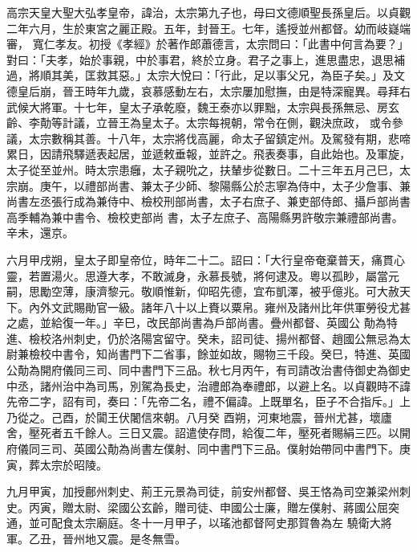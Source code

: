 
\begin{pinyinscope}

 高宗天皇大聖大弘孝皇帝，諱治，太宗第九子也，母曰文德順聖長孫皇后。以貞觀二年六月，生於東宮之麗正殿。五年，封晉王。七年，遙授並州都督。幼而岐嶷端審，
 寬仁孝友。初授《孝經》於著作郎蕭德言，太宗問曰：「此書中何言為要？」對曰：「夫孝，始於事親，中於事君，終於立身。君子之事上，進思盡忠，退思補過，將順其美，匡救其惡。」太宗大悅曰：「行此，足以事父兄，為臣子矣。」及文德皇后崩，晉王時年九歲，哀慕感動左右，太宗屢加慰撫，由是特深寵異。尋拜右武候大將軍。十七年，皇太子承乾廢，魏王泰亦以罪黜，太宗與長孫無忌、房玄齡、李勣等計議，立晉王為皇太子。太宗每視朝，常令在側，觀決庶政，
 或令參議，太宗數稱其善。十八年，太宗將伐高麗，命太子留鎮定州。及駕發有期，悲啼累日，因請飛驛遞表起居，並遞敕垂報，並許之。飛表奏事，自此始也。及軍旋，太子從至並州。時太宗患癰，太子親吮之，扶輦步從數日。二十三年五月己巳，太宗崩。庚午，以禮部尚書、兼太子少師、黎陽縣公於志寧為侍中，太子少詹事、兼尚書左丞張行成為兼侍中、檢校刑部尚書，太子右庶子、兼吏部侍郎、攝戶部尚書高季輔為兼中書令、檢校吏部尚
 書，太子左庶子、高陽縣男許敬宗兼禮部尚書。辛未，還京。



 六月甲戌朔，皇太子即皇帝位，時年二十二。詔曰：「大行皇帝奄棄普天，痛貫心靈，若置湯火。思遵大孝，不敢滅身，永慕長號，將何逮及。粵以孤眇，屬當元嗣，思勵空薄，康濟黎元。敬順惟新，仰昭先德，宜布凱澤，被乎億兆。可大赦天下。內外文武賜勛官一級。諸年八十以上賚以粟帛。雍州及諸州比年供軍勞役尤甚之處，並給復一年。」辛巳，改民部尚書為戶部尚書。疊州都督、英國公
 勣為特進、檢校洛州刺史，仍於洛陽宮留守。癸未，詔司徒、揚州都督、趙國公無忌為太尉兼檢校中書令，知尚書門下二省事，餘並如故，賜物三千段。癸巳，特進、英國公勣為開府儀同三司、同中書門下三品。秋七月丙午，有司請改治書侍御史為御史中丞，諸州治中為司馬，別駕為長史，治禮郎為奉禮郎，以避上名。以貞觀時不諱先帝二字，詔有司，奏曰：「先帝二名，禮不偏諱。上既單名，臣子不合指斥。」上乃從之。己酉，於闐王伏闍信來朝。八月癸
 酉朔，河東地震，晉州尤甚，壞廬舍，壓死者五千餘人。三日又震。詔遣使存問，給復二年，壓死者賜絹三匹。以開府儀同三司、英國公勣為尚書左僕射、同中書門下三品。僕射始帶同中書門下。庚寅，葬太宗於昭陵。



 九月甲寅，加授鄜州刺史、荊王元景為司徒，前安州都督、吳王恪為司空兼梁州刺史。丙寅，贈太尉、梁國公玄齡，贈司徒、申國公士廉，贈左僕射、蔣國公屈突通，並可配食太宗廟庭。冬十一月甲子，以瑤池都督阿史那賀魯為左
 驍衛大將軍。乙丑，晉州地又震。是冬無雪。




\end{pinyinscope}
